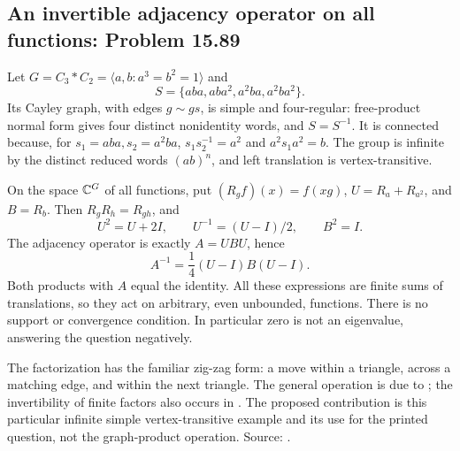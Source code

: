 \subsection{An invertible adjacency operator on all functions: Problem 15.89}
\label{cand:15.89}

Let \(G=C_3*C_2=\langle a,b:a^3=b^2=1\rangle\) and
\[
 S=\{aba,aba^2,a^2ba,a^2ba^2\}.
\]
Its Cayley graph, with edges \(g\sim gs\), is simple
and four-regular: free-product normal form gives four
distinct nonidentity words, and \(S=S^{-1}\).
It is connected because, for \(s_1=aba,s_2=a^2ba\),
\(s_1s_2^{-1}=a^2\) and \(a^2s_1a^2=b\).
The group is infinite by the distinct reduced words
\((ab)^n\), and left translation is vertex-transitive.

On the space \(\mathbb C^G\) of all functions, put
\((R_gf)(x)=f(xg)\), \(U=R_a+R_{a^2}\), and
\(B=R_b\). Then \(R_gR_h=R_{gh}\), and
\[
 U^2=U+2I,\qquad U^{-1}=(U-I)/2,\qquad B^2=I.
\]
The adjacency operator is exactly \(A=UBU\), hence
\[
 A^{-1}=\frac14(U-I)B(U-I).
\]
Both products with \(A\) equal the identity.
All these expressions are finite sums of translations,
so they act on arbitrary, even unbounded, functions.
There is no support or convergence condition.
In particular zero is not an eigenvalue, answering
the question negatively.

The factorization has the familiar zig-zag form:
a move within a triangle, across a matching edge,
and within the next triangle. The general operation
is due to \cite{zigzag}; the invertibility of finite
factors also occurs in \cite{permutational-powers}.
The proposed contribution is this particular infinite
simple vertex-transitive example and its use for
the printed question, not the graph-product operation.
Source: .


